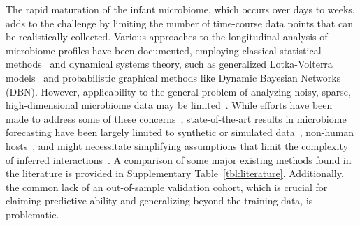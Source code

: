 \documentclass[onecolumn,10pt]{IEEEtran}
\def\EXTENDEDDATA{Supplementary\xspace}
\begin{document}
The rapid maturation of the infant microbiome, which occurs over days to weeks, adds to the challenge by limiting the number of time-course data points that can be realistically collected. Various approaches to the longitudinal analysis of microbiome profiles have been documented, employing classical statistical methods~\cite{gajer2012temporal,la2014patterned} and dynamical systems theory, such as generalized Lotka-Volterra models~\cite{gibson2018robust} and probabilistic graphical methods like Dynamic Bayesian Networks~\cite{mcgeachie2016longitudinal} (DBN). However,  applicability to the general problem of analyzing noisy, sparse, high-dimensional microbiome data may be limited~\cite{lugo2019dynamic}. While efforts have been made to address some of these concerns~\cite{lugo2019dynamic,joseph2020efficient,ruiz2021dynamic}, state-of-the-art results in microbiome forecasting have  been largely limited to synthetic or simulated data~\cite{gibson2018robust,joseph2020efficient},  non-human hosts~\cite{bucci2016mdsine,alshawaqfeh2017inferring,gao2018inference}, and might  necessitate simplifying assumptions that limit the complexity of inferred interactions~\cite{bucci2016mdsine,mcgeachie2016longitudinal,gibson2018robust,gao2018inference,lugo2019dynamic,joseph2020efficient,ruiz2021dynamic}. A comparison of some major existing methods found in the literature is provided in \EXTENDEDDATA Table~\ref{tbl:literature}. Additionally, the common lack of an out-of-sample validation cohort, which is crucial for claiming predictive ability and generalizing beyond the training data, is problematic. 

%
\end{document}
